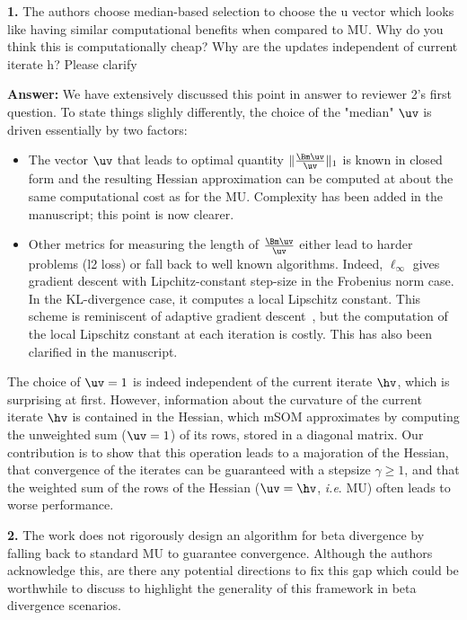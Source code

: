 \documentclass[10pt]{article} %
\newcommand{\answer}[1]{{\textbf{Answer:} \color{blue} #1}}
\begin{document}
\textbf{1.} The authors choose median-based selection to choose the u vector which looks like having similar computational benefits when compared to MU. Why do you think this is computationally cheap? Why are the updates independent of current iterate h? Please clarify

\answer{We have extensively discussed this point in answer to reviewer 2's first question. To state things slighly differently, the choice of the "median" $\uv$ is driven essentially by two factors:
\begin{itemize}
    \item The vector $\uv$ that leads to optimal quantity $\|\frac{\Bm\uv}{\uv} \|_1$ is known in closed form and the resulting Hessian approximation can be computed at about the same computational cost as for the MU. Complexity has been added in the manuscript; this point is now clearer.
    \item Other metrics for measuring the length of $\frac{\Bm\uv}{\uv}$ either lead to harder problems (l2 loss) or fall back to well known algorithms. Indeed, $\ell_\infty$ gives gradient descent with Lipchitz-constant step-size in the Frobenius norm case. In the KL-divergence case, it computes a local Lipschitz constant. This scheme is reminiscent of adaptive gradient descent~\cite{malitskyAdaptiveGradientDescent2020b}, but the computation of the local Lipschitz constant at each iteration is costly. This has also been clarified in the manuscript.
\end{itemize}

The choice of $\uv=1$ is indeed independent of the current iterate $\hv$, which is surprising at first. However, information about the curvature of the current iterate $\hv$ is contained in the Hessian, which mSOM approximates by computing the unweighted sum ($\uv=1$) of its rows, stored in a diagonal matrix. Our contribution is to show that this operation leads to a majoration of the Hessian, that convergence of the iterates can be guaranteed with a stepsize $\gamma\geq1$, and that the weighted sum of the rows of the Hessian ($\uv=\hv$, \textit{i.e}. MU) often leads to worse performance.
}

\textbf{2.} The work does not rigorously design an algorithm for beta divergence by falling back to standard MU to guarantee convergence. Although the authors acknowledge this, are there any potential directions to fix this gap which could be worthwhile to discuss to highlight the generality of this framework in beta divergence scenarios.
\end{document}
